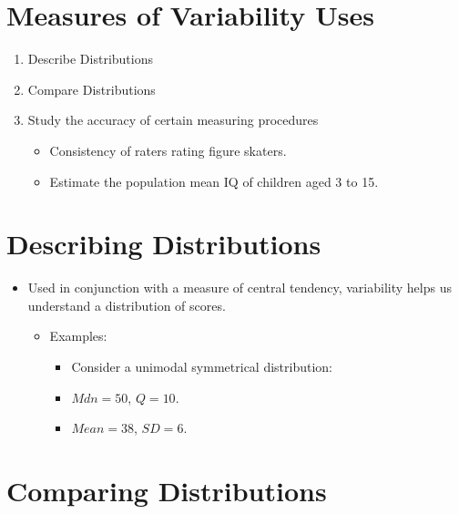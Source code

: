 \documentclass[12pt]{article}
\begin{document}
\section{Measures of Variability
Uses}\label{measures-of-variability-uses}

\begin{enumerate}
\def\labelenumi{\arabic{enumi}.}
\itemsep1pt\parskip0pt
\item
  Describe Distributions
\item
  Compare Distributions
\item
  Study the accuracy of certain measuring procedures

  \begin{itemize}
  \itemsep1pt\parskip0pt
  \item
    Consistency of raters rating figure skaters.
  \item
    Estimate the population mean IQ of children aged 3 to 15.
  \end{itemize}
\end{enumerate}

\section{Describing Distributions}\label{describing-distributions}

\begin{itemize}
\itemsep1pt\parskip0pt
\item
  Used in conjunction with a measure of central tendency, variability
  helps us understand a distribution of scores.

  \begin{itemize}
  \itemsep1pt\parskip0pt
  \item
    Examples:

    \begin{itemize}
    \itemsep1pt\parskip0pt
    \item
      Consider a unimodal symmetrical distribution:
    \item
      \(Mdn = 50\), \(Q = 10\).
    \item
      \(Mean = 38\), \(SD = 6\).
    \end{itemize}
  \end{itemize}
\end{itemize}

\section{Comparing Distributions}\label{comparing-distributions}
\end{document}
